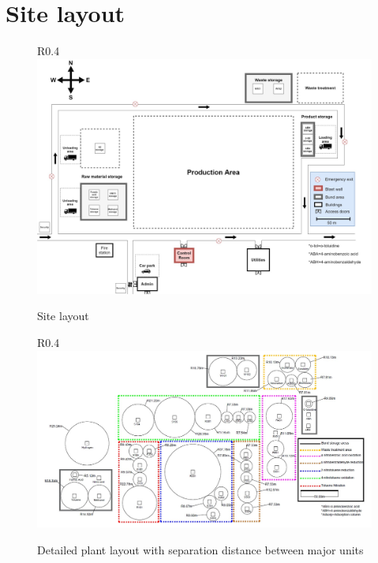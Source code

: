\section{Site layout}


\begin{figure}{R}{0.4\linewidth}
\centering
\includegraphics[width=\linewidth]{chapters/Z-support/figures/Sitelayout.jpg}
\caption{Site layout}
\label{fig:site}
\end{figure}

\begin{figure}{R}{0.4\linewidth}
\centering
\includegraphics[width=\linewidth]{chapters/Z-support/figures/detailedlayout.jpg}
\caption{Detailed plant layout with separation distance between major units}
\label{fig:detailed_layout}
\end{figure}